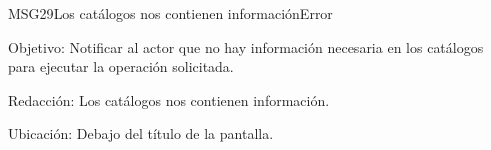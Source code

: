 \begin{mensaje}{MSG29}{Los catálogos nos contienen información}{Error}
	\item [Objetivo:] Notificar al actor que no hay información necesaria en los catálogos para ejecutar la operación solicitada.
	\item[Redacción:] Los catálogos nos contienen información.
	\item [Ubicación:] Debajo del título de la pantalla.
\end{mensaje}
